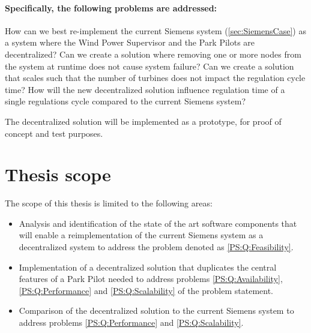 \paragraph{Specifically, the following problems are addressed:}
\begin{description} %
	 How can we best re-implement the current Siemens system (\cref{sec:SiemensCase}) as a system where the Wind Power Supervisor and the Park Pilots are decentralized?
	 Can we create a solution where removing one or more nodes from the system at runtime does not cause system failure?
	 Can we create a solution that scales such that the number of turbines does not impact the regulation cycle time?
	 How will the new decentralized solution influence regulation time of a single regulations cycle compared to the current Siemens system?
	
\end{description}

The decentralized solution will be implemented as a prototype, for proof of concept and test purposes.

\section{Thesis scope}
\label{sec:thesisScope}
The scope of this thesis is limited to the following areas:

\begin{itemize}
	\item Analysis and identification of the state of the art software components that will enable a reimplementation of the current Siemens system as a decentralized system to address the problem denoted as \ref{PS:Q:Feasibility}.
	\item Implementation of a decentralized solution that duplicates the central features of a Park Pilot needed to address problems \ref{PS:Q:Availability}, \ref{PS:Q:Performance} and \ref{PS:Q:Scalability} of the problem statement.
	\item Comparison of the decentralized solution to the current Siemens system to address problems \ref{PS:Q:Performance} and \ref{PS:Q:Scalability}.
\end{itemize}


